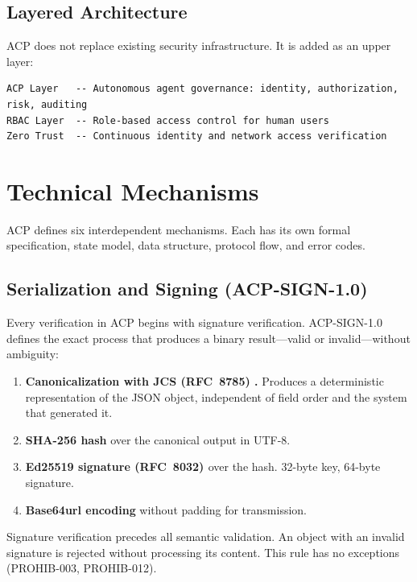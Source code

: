\documentclass[11pt]{article}
\theoremstyle{definition}
\begin{document}
\subsection{Layered Architecture}

ACP does not replace existing security infrastructure. It is added as an upper layer:

\begin{lstlisting}
ACP Layer   -- Autonomous agent governance: identity, authorization, risk, auditing
RBAC Layer  -- Role-based access control for human users
Zero Trust  -- Continuous identity and network access verification
\end{lstlisting}

\section{Technical Mechanisms}

ACP defines six interdependent mechanisms. Each has its own formal specification, state model, data structure, protocol flow, and error codes.

\subsection{Serialization and Signing (ACP-SIGN-1.0)}

Every verification in ACP begins with signature verification.
ACP-SIGN-1.0 defines the exact process that produces a binary result---valid or invalid---without ambiguity:

\begin{enumerate}[noitemsep]
  \item \textbf{Canonicalization with JCS (RFC~8785) \cite{rfc8785}.}
        Produces a deterministic representation of the JSON object, independent of field order and the system that generated it.
  \item \textbf{SHA-256 hash} over the canonical output in UTF-8.
  \item \textbf{Ed25519 signature (RFC~8032) \cite{rfc8032}} over the hash.
        32-byte key, 64-byte signature.
  \item \textbf{Base64url encoding} without padding for transmission.
\end{enumerate}

Signature verification precedes all semantic validation.
An object with an invalid signature is rejected without processing its content.
This rule has no exceptions (PROHIB-003, PROHIB-012).
\end{document}
